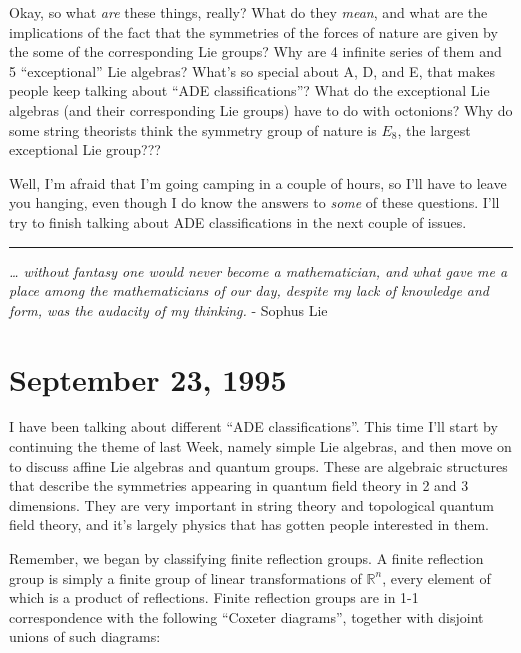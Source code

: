 \documentclass{article}
\begin{document}
Okay, so what \emph{are} these things, really? What do they \emph{mean},
and what are the implications of the fact that the symmetries of the
forces of nature are given by the some of the corresponding Lie groups?
Why are 4 infinite series of them and 5 ``exceptional'' Lie algebras?
What's so special about A, D, and E, that makes people keep talking
about ``ADE classifications''? What do the exceptional Lie algebras (and
their corresponding Lie groups) have to do with octonions? Why do some
string theorists think the symmetry group of nature is \(E_8\), the
largest exceptional Lie group???

Well, I'm afraid that I'm going camping in a couple of hours, so I'll
have to leave you hanging, even though I do know the answers to
\emph{some} of these questions. I'll try to finish talking about ADE
classifications in the next couple of issues.

\begin{center}\rule{0.5\linewidth}{0.5pt}\end{center}

\emph{\ldots{} without fantasy one would never become a mathematician,
and what gave me a place among the mathematicians of our day, despite my
lack of knowledge and form, was the audacity of my thinking.} - Sophus
Lie
\hypertarget{week64}{%
\section{September 23, 1995}\label{week64}}

I have been talking about different ``ADE classifications''. This time
I'll start by continuing the theme of last Week, namely simple Lie
algebras, and then move on to discuss affine Lie algebras and quantum
groups. These are algebraic structures that describe the symmetries
appearing in quantum field theory in 2 and 3 dimensions. They are very
important in string theory and topological quantum field theory, and
it's largely physics that has gotten people interested in them.

Remember, we began by classifying finite reflection groups. A finite
reflection group is simply a finite group of linear transformations of
\(\mathbb{R}^n\), every element of which is a product of reflections.
Finite reflection groups are in 1-1 correspondence with the following
``Coxeter diagrams'', together with disjoint unions of such diagrams:
\end{document}
